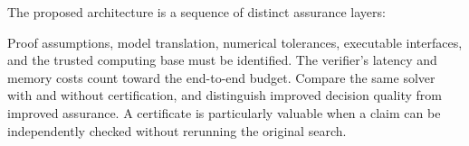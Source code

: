 \documentclass[11pt,letterpaper]{article}
\begin{document}
The proposed architecture is a sequence of distinct assurance layers:
\begin{center}
\end{center}
Proof assumptions, model translation, numerical tolerances, executable interfaces, and the trusted computing base must be identified. The verifier's latency and memory costs count toward the end-to-end budget. Compare the same solver with and without certification, and distinguish improved decision quality from improved assurance. A certificate is particularly valuable when a claim can be independently checked without rerunning the original search.
\end{document}
